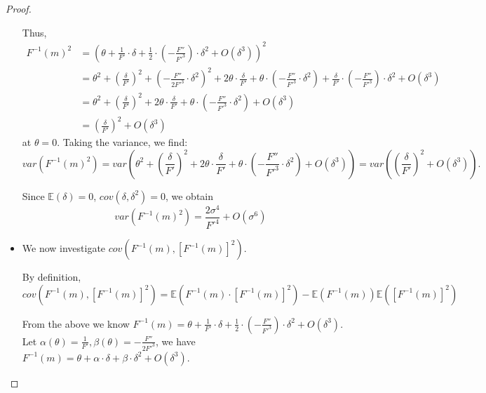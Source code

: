 \begin{proof}
\begin{itemize}
    
    Thus,
    \begin{align*}
        F^{-1}(m)^2 &= \left(\theta + \frac{1}{F'} \cdot \delta + \frac{1}{2} \cdot (-\frac{F''}{F'^3}) \cdot \delta^2 + O(\delta^3)\right)^2\\
        &=\theta^2 + \left(\frac{\delta}{F'}\right)^2 + \left(-\frac{F''}{2F'^3} \cdot \delta^2\right)^2 + 2\theta \cdot \frac{\delta}{F'} + \theta \cdot \left(-\frac{F''}{F'^3} \cdot \delta^2\right) + \frac{\delta}{F'} \cdot \left(-\frac{F''}{F'^3}\right) \cdot \delta^2 + O(\delta^3)\\
        &=\theta^2 + \left(\frac{\delta}{F'}\right)^2 + 2\theta \cdot \frac{\delta}{F'} + \theta \cdot \left(-\frac{F''}{F'^3} \cdot \delta^2\right) + O(\delta^3)\\
        &= \left(\frac{\delta}{F'}\right)^2 + O(\delta^3)
    \end{align*}
    at $\theta=0$.
    Taking the variance, we find:
    \begin{equation}
    var\left(F^{-1}(m)^2\right) = var\left(\theta^2 + \left(\frac{\delta}{F'}\right)^2 + 2\theta \cdot \frac{\delta}{F'} + \theta \cdot \left(-\frac{F''}{F'^3} \cdot \delta^2\right) + O(\delta^3)\right)=var\left(\left(\frac{\delta}{F'}\right)^2 + O(\delta^3)\right).
    \end{equation}
    
    Since  $\mathbb{E}(\delta) = 0$, $cov(\delta, \delta^2) = 0$, we obtain
    \begin{equation}
    var(F^{-1}(m)^2)=\frac{2\sigma^4}{F'^4} + O(\sigma^6)
    \end{equation}
    
    \item We now investigate {$cov\left(F^{-1}(m),[F^{-1}(m)]^2\right)$}.

    By definition, $cov(F^{-1}(m),[F^{-1}(m)]^2) = \mathbb{E}(F^{-1}(m) \cdot [F^{-1}(m)]^2) - \mathbb{E}(F^{-1}(m))\mathbb{E}([F^{-1}(m)]^2)$

    From the above we know $F^{-1}(m) = \theta + \frac{1}{F'} \cdot \delta + \frac{1}{2} \cdot \left(-\frac{F''}{F'^3}\right) \cdot \delta^2 + O(\delta^3)$. Let $\alpha(\theta)=\frac{1}{F'}, \beta(\theta) = -\frac{F''}{2F'^3}$, we have $F^{-1}(m) = \theta + \alpha \cdot \delta +  \beta \cdot \delta^2 + O(\delta^3)$. 


\end{itemize}
\end{proof}
